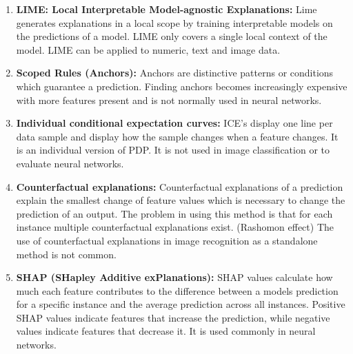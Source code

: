 \begin{enumerate}
	\item \textbf{LIME: Local Interpretable Model-agnostic Explanations:} Lime generates explanations in a local scope by training interpretable models on the predictions of a model. LIME only covers a single local context of the model. LIME can be applied to numeric, text and image data.
	\item \textbf{Scoped Rules (Anchors):} Anchors are distinctive patterns or conditions which guarantee a prediction. Finding anchors becomes increasingly expensive with more features present and is not normally used in neural networks. \cite{ribeiro2018}
	\item \textbf{Individual conditional expectation curves:} ICE's display one line per data sample and display how the sample changes when a feature changes. It is an individual version of PDP. \cite{goldstein2014peeking} It is not used in image classification or to evaluate neural networks.
	\item \textbf{Counterfactual explanations:} Counterfactual explanations of a prediction explain the smallest change of feature values which is necessary to change the prediction of an output. The problem in using this method is that for each instance multiple counterfactual explanations exist. (Rashomon effect) The use of counterfactual explanations in image recognition as a standalone method is not common.
	\item \textbf{SHAP (SHapley Additive exPlanations):} SHAP values \cite{lundberg2017unified} calculate how much each feature contributes to the difference between a models prediction for a specific instance and the average prediction across all instances. Positive SHAP values indicate features that increase the prediction, while negative values indicate features that decrease it. It is used commonly in neural networks.
\end{enumerate}

